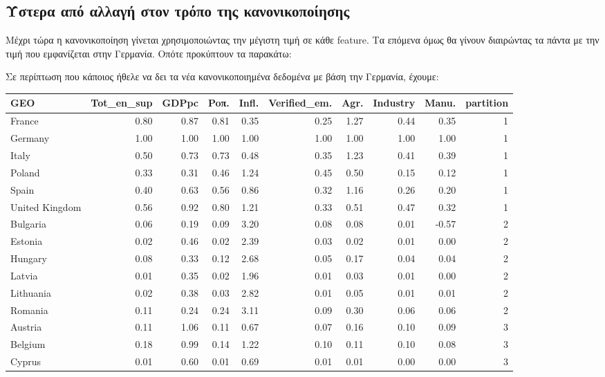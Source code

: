 \documentclass[a4paper,twoside,10pt]{article}
\begin{document}
\subsection{Ύστερα από αλλαγή στον τρόπο της κανονικοποίησης}
Μέχρι τώρα η κανονικοποίηση γίνεται χρησιμοποιώντας την μέγιστη τιμή σε κάθε feature. Τα επόμενα όμως θα γίνουν διαιρώντας τα πάντα με την τιμή που εμφανίζεται στην Γερμανία. Οπότε προκύπτουν τα παρακάτω:


Σε περίπτωση που κάποιος ήθελε να δει τα νέα κανονικοποιημένα δεδομένα με βάση την Γερμανία, έχουμε:
\begin{table}[ht]
	\centering
	\tabcolsep=0.11cm
	\begin{tabular}{lrrrrrrrrr}
		\hline
		GEO & Tot\_en\_sup & GDPpc & Poπ. & Infl. & Verified\_em. & Agr. & Industry & Manu. & partition \\ 
		\hline
		 France & 0.80 & 0.87 & 0.81 & 0.35 & 0.25 & 1.27 & 0.44 & 0.35 &   1 \\ 
		 \rowcolor{yellow} Germany & 1.00 & 1.00 & 1.00 & 1.00 & 1.00 & 1.00 & 1.00 & 1.00 &   1 \\ 
		 Italy & 0.50 & 0.73 & 0.73 & 0.48 & 0.35 & 1.23 & 0.41 & 0.39 &   1 \\ 
		 \rowcolor{cyan} Poland & 0.33 & 0.31 & 0.46 & 1.24 & 0.45 & 0.50 & 0.15 & 0.12 &   1 \\ 
		 Spain & 0.40 & 0.63 & 0.56 & 0.86 & 0.32 & 1.16 & 0.26 & 0.20 &   1 \\ 
		 United Kingdom & 0.56 & 0.92 & 0.80 & 1.21 & 0.33 & 0.51 & 0.47 & 0.32 &   1 \\ 
		 \hline
		 Bulgaria & 0.06 & 0.19 & 0.09 & 3.20 & 0.08 & 0.08 & 0.01 & -0.57 &   2 \\ 
		 Estonia & 0.02 & 0.46 & 0.02 & 2.39 & 0.03 & 0.02 & 0.01 & 0.00 &   2 \\ 
		 Hungary & 0.08 & 0.33 & 0.12 & 2.68 & 0.05 & 0.17 & 0.04 & 0.04 &   2 \\ 
		 Latvia & 0.01 & 0.35 & 0.02 & 1.96 & 0.01 & 0.03 & 0.01 & 0.00 &   2 \\ 
		 Lithuania & 0.02 & 0.38 & 0.03 & 2.82 & 0.01 & 0.05 & 0.01 & 0.01 &   2 \\ 
		 Romania & 0.11 & 0.24 & 0.24 & 3.11 & 0.09 & 0.30 & 0.06 & 0.06 &   2 \\ 
		 \hline
		 Austria & 0.11 & 1.06 & 0.11 & 0.67 & 0.07 & 0.16 & 0.10 & 0.09 &   3 \\ 
		 Belgium & 0.18 & 0.99 & 0.14 & 1.22 & 0.10 & 0.11 & 0.10 & 0.08 &   3 \\ 
		 Cyprus & 0.01 & 0.60 & 0.01 & 0.69 & 0.01 & 0.01 & 0.00 & 0.00 &   3 \\ 

\end{tabular}
\end{table}
\end{document}
